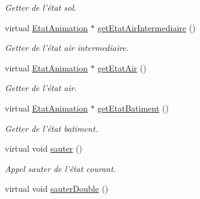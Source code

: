 \begin{DoxyCompactItemize}
\begin{DoxyCompactList}\small\item\em Getter de l'état sol. \end{DoxyCompactList}\item 
\hypertarget{classPersonnage_aed0a5b70ded5b86d18318c0ddac44216}{virtual \hyperlink{classEtatAnimation}{Etat\-Animation} $\ast$ \hyperlink{classPersonnage_aed0a5b70ded5b86d18318c0ddac44216}{get\-Etat\-Air\-Intermediaire} ()}\label{classPersonnage_aed0a5b70ded5b86d18318c0ddac44216}

\begin{DoxyCompactList}\small\item\em Getter de l'état air intermediaire. \end{DoxyCompactList}\item 
\hypertarget{classPersonnage_a09fc1d95c50aacfb88f45cabbd3a719e}{virtual \hyperlink{classEtatAnimation}{Etat\-Animation} $\ast$ \hyperlink{classPersonnage_a09fc1d95c50aacfb88f45cabbd3a719e}{get\-Etat\-Air} ()}\label{classPersonnage_a09fc1d95c50aacfb88f45cabbd3a719e}

\begin{DoxyCompactList}\small\item\em Getter de l'état air. \end{DoxyCompactList}\item 
\hypertarget{classPersonnage_ae2a0469492e42000169ff5e026e4ac40}{virtual \hyperlink{classEtatAnimation}{Etat\-Animation} $\ast$ \hyperlink{classPersonnage_ae2a0469492e42000169ff5e026e4ac40}{get\-Etat\-Batiment} ()}\label{classPersonnage_ae2a0469492e42000169ff5e026e4ac40}

\begin{DoxyCompactList}\small\item\em Getter de l'état batiment. \end{DoxyCompactList}\item 
\hypertarget{classPersonnage_a50618688b71d5f1164f79f0a6ff28957}{virtual void \hyperlink{classPersonnage_a50618688b71d5f1164f79f0a6ff28957}{sauter} ()}\label{classPersonnage_a50618688b71d5f1164f79f0a6ff28957}

\begin{DoxyCompactList}\small\item\em Appel sauter de l'état courant. \end{DoxyCompactList}\item 
\hypertarget{classPersonnage_a9b599463cfe2c816baf6ecdc82683f1a}{virtual void \hyperlink{classPersonnage_a9b599463cfe2c816baf6ecdc82683f1a}{sauter\-Double} ()}\label{classPersonnage_a9b599463cfe2c816baf6ecdc82683f1a}


\end{DoxyCompactItemize}
